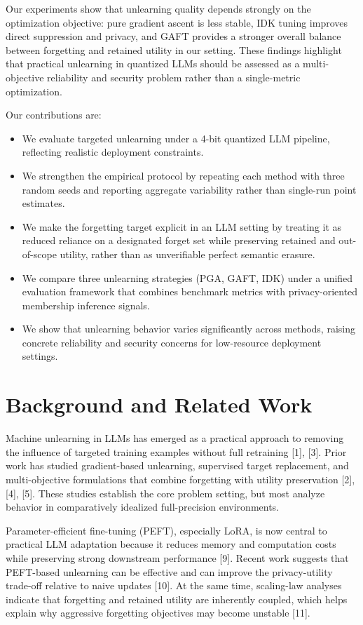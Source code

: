 \documentclass[conference]{IEEEtran}
\begin{document}
Our experiments show that unlearning quality depends strongly on the optimization objective: pure gradient ascent is less stable, IDK tuning improves direct suppression and privacy, and GAFT provides a stronger overall balance between forgetting and retained utility in our setting. These findings highlight that practical unlearning in quantized LLMs should be assessed as a multi-objective reliability and security problem rather than a single-metric optimization.

Our contributions are:
\begin{itemize}
\item We evaluate targeted unlearning under a 4-bit quantized LLM pipeline, reflecting realistic deployment constraints.
\item We strengthen the empirical protocol by repeating each method with three random seeds and reporting aggregate variability rather than single-run point estimates.
\item We make the forgetting target explicit in an LLM setting by treating it as reduced reliance on a designated forget set while preserving retained and out-of-scope utility, rather than as unverifiable perfect semantic erasure.
\item We compare three unlearning strategies (PGA, GAFT, IDK) under a unified evaluation framework that combines benchmark metrics with privacy-oriented membership inference signals.
\item We show that unlearning behavior varies significantly across methods, raising concrete reliability and security concerns for low-resource deployment settings.
\end{itemize}

\section{Background and Related Work}
Machine unlearning in LLMs has emerged as a practical approach to removing the influence of targeted training examples without full retraining [1], [3]. Prior work has studied gradient-based unlearning, supervised target replacement, and multi-objective formulations that combine forgetting with utility preservation [2], [4], [5]. These studies establish the core problem setting, but most analyze behavior in comparatively idealized full-precision environments.

Parameter-efficient fine-tuning (PEFT), especially LoRA, is now central to practical LLM adaptation because it reduces memory and computation costs while preserving strong downstream performance [9]. Recent work suggests that PEFT-based unlearning can be effective and can improve the privacy-utility trade-off relative to naive updates [10]. At the same time, scaling-law analyses indicate that forgetting and retained utility are inherently coupled, which helps explain why aggressive forgetting objectives may become unstable [11].
\end{document}
